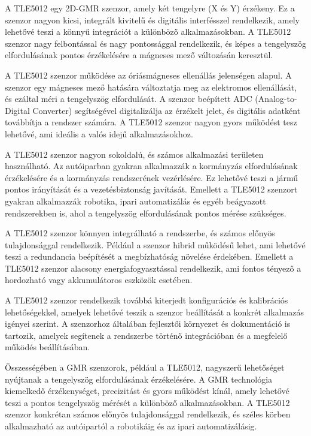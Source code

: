 A TLE5012 egy 2D-GMR szenzor, amely két tengelyre (X és Y) érzékeny. Ez a szenzor nagyon kicsi, integrált kivitelű és digitális interfésszel rendelkezik, amely lehetővé teszi a könnyű integrációt a különböző alkalmazásokban. A TLE5012 szenzor nagy felbontással és nagy pontossággal rendelkezik, és képes a tengelyszög elfordulásának pontos érzékelésére a mágneses mező változásán keresztül.

A TLE5012 szenzor működése az óriásmágneses ellenállás jelenségen alapul. A szenzor egy mágneses mező hatására változtatja meg az elektromos ellenállását, és ezáltal méri a tengelyszög elfordulását. A szenzor beépített ADC (Analog-to-Digital Converter) segítségével digitalizálja az érzékelt jelet, és digitális adatként továbbítja a rendszer számára. A TLE5012 szenzor nagyon gyors működést tesz lehetővé, ami ideális a valós idejű alkalmazásokhoz.

A TLE5012 szenzor nagyon sokoldalú, és számos alkalmazási területen használható. Az autóiparban gyakran alkalmazzák a kormányzás elfordulásának érzékelésére és a kormányzás rendszerének vezérlésére. Ez lehetővé teszi a jármű pontos irányítását és a vezetésbiztonság javítását. Emellett a TLE5012 szenzort gyakran alkalmazzák robotika, ipari automatizálás és egyéb beágyazott rendszerekben is, ahol a tengelyszög elfordulásának pontos mérése szükséges.

A TLE5012 szenzor könnyen integrálható a rendszerbe, és számos előnyös tulajdonsággal rendelkezik. Például a szenzor hibrid működésű lehet, ami lehetővé teszi a redundancia beépítését a megbízhatóság növelése érdekében. Emellett a TLE5012 szenzor alacsony energiafogyasztással rendelkezik, ami fontos tényező a hordozható vagy akkumulátoros eszközök esetében.

A TLE5012 szenzor rendelkezik továbbá kiterjedt konfigurációs és kalibrációs lehetőségekkel, amelyek lehetővé teszik a szenzor beállítását a konkrét alkalmazás igényei szerint. A szenzorhoz általában fejlesztői környezet és dokumentáció is tartozik, amelyek segítenek a rendszerbe történő integrációban és a megfelelő működés beállításában.

Összességében a GMR szenzorok, például a TLE5012, nagyszerű lehetőséget nyújtanak a tengelyszög elfordulásának érzékelésére. A GMR technológia kiemelkedő érzékenységet, precizitást és gyors működést kínál, amely lehetővé teszi a pontos tengelyszög mérését a különböző alkalmazásokban. A TLE5012 szenzor konkrétan számos előnyös tulajdonsággal rendelkezik, és széles körben alkalmazható az autóipartól a robotikáig és az ipari automatizálásig.